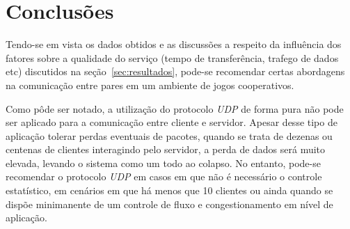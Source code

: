 \documentclass[12pt]{article}
\begin{document}
\section{Conclusões} \label{sec:conclusoes}

Tendo-se em vista os dados obtidos e as discussões a respeito da influência dos fatores sobre a qualidade do serviço (tempo de transferência, trafego de dados etc) discutidos na seção~\ref{sec:resultados}, pode-se recomendar certas abordagens na comunicação entre pares em um ambiente de jogos cooperativos.

Como pôde ser notado, a utilização do protocolo \emph{UDP} de forma pura não pode ser aplicado para a comunicação entre cliente e servidor. Apesar desse tipo de aplicação tolerar perdas eventuais de pacotes, quando se trata de dezenas ou centenas de clientes interagindo pelo servidor, a perda de dados será muito elevada, levando o sistema como um todo ao colapso.
No entanto, pode-se recomendar o protocolo \emph{UDP} em casos em que não é necessário o controle estatístico, em cenários em que há menos que 10 clientes ou ainda quando se dispõe minimanente de um controle de fluxo e congestionamento em nível de aplicação.





\end{document}
